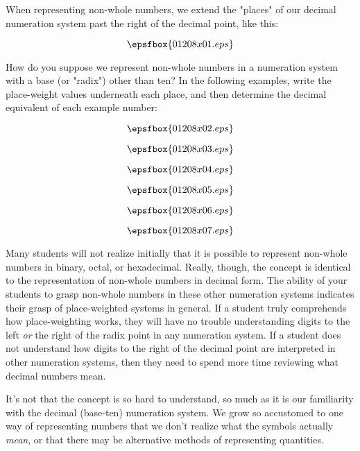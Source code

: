 

When representing non-whole numbers, we extend the "places" of our decimal numeration system past the right of the decimal point, like this:

$$\epsfbox{01208x01.eps}$$

How do you suppose we represent non-whole numbers in a numeration system with a base (or "radix") other than ten?  In the following examples, write the place-weight values underneath each place, and then determine the decimal equivalent of each example number:

\vskip 10pt

$$\epsfbox{01208x02.eps}$$

\vskip 20pt

$$\epsfbox{01208x03.eps}$$

\vskip 20pt

$$\epsfbox{01208x04.eps}$$







$$\epsfbox{01208x05.eps}$$

\vskip 20pt

$$\epsfbox{01208x06.eps}$$

\vskip 20pt

$$\epsfbox{01208x07.eps}$$







Many students will not realize initially that it is possible to represent non-whole numbers in binary, octal, or hexadecimal.  Really, though, the concept is identical to the representation of non-whole numbers in decimal form.  The ability of your students to grasp non-whole numbers in these other numeration systems indicates their grasp of place-weighted systems in general.  If a student truly comprehends how place-weighting works, they will have no trouble understanding digits to the left {\it or} the right of the radix point in any numeration system.  If a student does not understand how digits to the right of the decimal point are interpreted in other numeration systems, then they need to spend more time reviewing what decimal numbers mean.

It's not that the concept is so hard to understand, so much as it is our familiarity with the decimal (base-ten) numeration system.  We grow so accustomed to one way of representing numbers that we don't realize what the symbols actually {\it mean}, or that there may be alternative methods of representing quantities.




